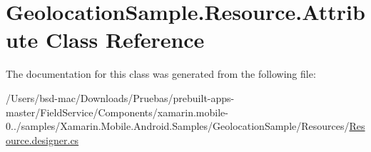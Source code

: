 \hypertarget{class_geolocation_sample_1_1_resource_1_1_attribute}{\section{Geolocation\+Sample.\+Resource.\+Attribute Class Reference}
\label{class_geolocation_sample_1_1_resource_1_1_attribute}
}


The documentation for this class was generated from the following file\+:\begin{DoxyCompactItemize}
\item 
/\+Users/bsd-\/mac/\+Downloads/\+Pruebas/prebuilt-\/apps-\/master/\+Field\+Service/\+Components/xamarin.\+mobile-\/0../samples/\+Xamarin.\+Mobile.\+Android.\+Samples/\+Geolocation\+Sample/\+Resources/\hyperlink{_components_2xamarin_8mobile-0_86_81_2samples_2_xamarin_8_mobile_8_android_8_samples_2_geolocati70c310c330f4a850881b004033a4fa1f}{Resource.\+designer.\+cs}\end{DoxyCompactItemize}
